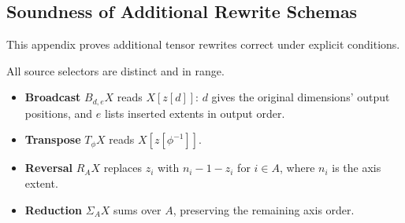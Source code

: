 \subsection{Soundness of Additional Rewrite Schemas}
\label{app:soundness-of-additional-rewrite-schemas}
This appendix proves additional tensor rewrites correct under explicit conditions.

All source selectors are distinct and in range.
\begin{itemize}
\item \textbf{Broadcast} $B_{d,e}X$ reads $X[z[d]]$:
$d$ gives the original dimensions' output positions, and $e$
lists inserted extents in output order.
\item \textbf{Transpose} $T_\phi X$ reads $X[z[\phi^{-1}]]$.
\item \textbf{Reversal} $R_AX$ replaces $z_i$ with $n_i-1-z_i$
for $i\in A$, where $n_i$ is the axis extent.
\item \textbf{Reduction} $\Sigma_AX$ sums over $A$,
preserving the remaining axis order.
\end{itemize}

